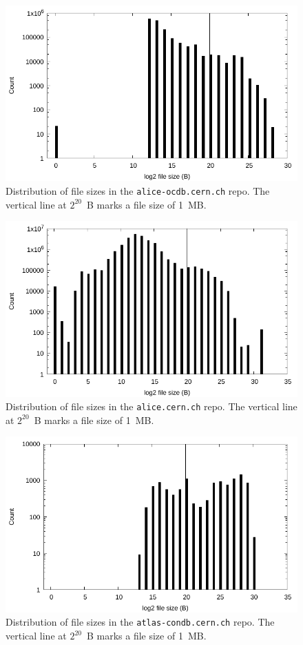 \documentclass[sigconf]{acmart}
\begin{document}
\begin{figure}
\includegraphics[width=\linewidth]{plots/file-hist/alice-ocdb.pdf}
\caption{Distribution of file sizes in the \texttt{alice-ocdb.cern.ch} repo.
The vertical line at $2^{20}$~B marks a file size of 1~MB.}
\end{figure}

\begin{figure}
\includegraphics[width=\linewidth]{plots/file-hist/alice.pdf}
\caption{Distribution of file sizes in the \texttt{alice.cern.ch} repo.
The vertical line at $2^{20}$~B marks a file size of 1~MB.}
\end{figure}

\begin{figure}
\includegraphics[width=\linewidth]{plots/file-hist/atlas-condb.pdf}
\caption{Distribution of file sizes in the \texttt{atlas-condb.cern.ch} repo.
The vertical line at $2^{20}$~B marks a file size of 1~MB.}
\end{figure}
\end{document}
